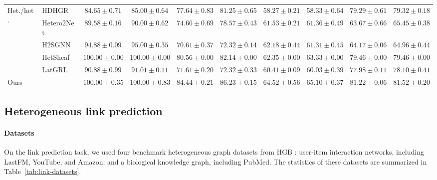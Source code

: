 \begin{table}[t]
{\begin{tabular}{llcccccccc}
    \multirow{5}{*}{Het./het.}
    & HDHGR
    & $84.65 \pm 0.71$
    & $85.00 \pm 0.64$
    & $77.64 \pm 0.83$
    & $81.25 \pm 0.65$
    & $58.27 \pm 0.21$
    & $58.33 \pm 0.64$
    & $79.29 \pm 0.61$
    & $79.32 \pm 0.18$ \\

    & Hetero2Net
    & $89.58 \pm 0.16$
    & $90.00 \pm 0.62$
    & $74.66 \pm 0.69$
    & $78.57 \pm 0.43$
    & $61.53 \pm 0.21$
    & $61.36 \pm 0.49$
    & $63.67 \pm 0.66$
    & $65.45 \pm 0.38$ \\

    & H2SGNN
    & $94.88 \pm 0.09$
    & $95.00 \pm 0.35$
    & $70.61 \pm 0.37$
    & $72.32 \pm 0.14$
    & $62.18 \pm 0.44$
    & $61.31 \pm 0.45$
    & $64.17 \pm 0.06$
    & $64.96 \pm 0.44$ \\

    & HetSheaf
    & $\mathbf{100.00 \pm 0.00}$
    & $\mathbf{100.00 \pm 0.00}$
    & $80.56 \pm 0.00$
    & $82.14 \pm 0.00$
    & $62.35 \pm 0.00$
    & $63.33 \pm 0.00$
    & $79.46 \pm 0.00$
    & $79.46 \pm 0.00$ \\

    & LatGRL
    & $90.88 \pm 0.99$
    & $91.01 \pm 0.11$
    & $71.61 \pm 0.20$
    & $72.32 \pm 0.33$
    & $60.41 \pm 0.09$
    & $60.03 \pm 0.39$
    & $77.98 \pm 0.11$
    & $78.10 \pm 0.41$ \\
    \midrule

    Ours
    & \textbf{\method{}}
    & $\mathbf{100.00 \pm 0.35}$
    & $\mathbf{100.00 \pm 0.83}$
    & $\mathbf{84.44 \pm 0.21}$
    & $\mathbf{86.23 \pm 0.15}$
    & $\mathbf{64.52 \pm 0.56}$
    & $\mathbf{65.10 \pm 0.37}$
    & $\mathbf{81.22 \pm 0.06}$
    & $\mathbf{81.52 \pm 0.20}$ \\
    \bottomrule
  \end{tabular}%
  }
\end{table}



\subsection{Heterogeneous link prediction}
\label{sec:setup-link}

\paragraph{Datasets}
On the link prediction task, we used four benchmark heterogeneous graph datasets from HGB \cite{lv2021hgb}: user-item interaction networks, including LastFM, YouTube, and Amazon; and a biological knowledge graph, including PubMed. The statistics of these datasets are summarized in Table~\ref{tab:link-datasets}.

